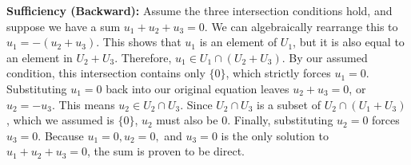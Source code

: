 \begin{tcolorbox}[colback=blue!5!white, colframe=blue!75!black, title=Extra Stuff]
\begin{itemize}
		\textbf{Sufficiency (Backward):} Assume the three intersection conditions hold, and suppose we have a sum $u_1 + u_2 + u_3 = 0$. We can algebraically rearrange this to $u_1 = -(u_2 + u_3)$. This shows that $u_1$ is an element of $U_1$, but it is also equal to an element in $U_2 + U_3$. Therefore, $u_1 \in U_1 \cap (U_2 + U_3)$. By our assumed condition, this intersection contains only $\{0\}$, which strictly forces $u_1 = 0$. Substituting $u_1 = 0$ back into our original equation leaves $u_2 + u_3 = 0$, or $u_2 = -u_3$. This means $u_2 \in U_2 \cap U_3$. Since $U_2 \cap U_3$ is a subset of $U_2 \cap (U_1 + U_3)$, which we assumed is $\{0\}$, $u_2$ must also be $0$. Finally, substituting $u_2 = 0$ forces $u_3 = 0$. Because $u_1 = 0, u_2 = 0,$ and $u_3 = 0$ is the only solution to $u_1 + u_2 + u_3 = 0$, the sum is proven to be direct.
	\end{itemize}
\end{tcolorbox}